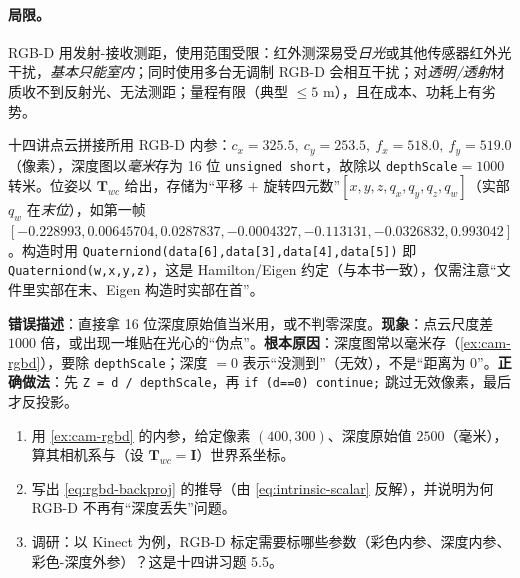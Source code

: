 \paragraph{局限。}
RGB-D 用发射-接收测距，使用范围受限\cite{gaoxiang2019slam14}：红外测深易受\emph{日光}或其他传感器红外光干扰，\emph{基本只能室内}；同时使用多台无调制 RGB-D 会相互干扰；对\emph{透明/透射}材质收不到反射光、无法测距；量程有限（典型 $\le5$ m\cite{carlone2026handbook}），且在成本、功耗上有劣势。

\begin{example}\label{ex:cam-rgbd}
十四讲点云拼接所用 RGB-D 内参\cite{gaoxiang2019slam14}：$c_x=325.5,\ c_y=253.5,\ f_x=518.0,\ f_y=519.0$（像素），深度图以\emph{毫米}存为 16 位 \texttt{unsigned short}，故除以 \texttt{depthScale}$=1000$ 转米。位姿以 $\mathbf{T}_{wc}$ 给出，存储为“平移 $+$ 旋转四元数”$[x,y,z,q_x,q_y,q_z,q_w]$（实部 $q_w$ 在\emph{末位}），如第一帧 $[-0.228993,0.00645704,0.0287837,-0.0004327,-0.113131,-0.0326832,0.993042]$。构造时用 \texttt{Quaterniond(data[6],data[3],data[4],data[5])} 即 \texttt{Quaterniond(w,x,y,z)}，这是 Hamilton/Eigen 约定（与本书一致），仅需注意“文件里实部在末、Eigen 构造时实部在首”。
\end{example}

\begin{pitfall}
\textbf{错误描述}：直接拿 16 位深度原始值当米用，或不判零深度。\textbf{现象}：点云尺度差 $1000$ 倍，或出现一堆贴在光心的“伪点”。\textbf{根本原因}：深度图常以毫米存（\cref{ex:cam-rgbd}），要除 \texttt{depthScale}；深度 $=0$ 表示“没测到”（无效），不是“距离为 0”。\textbf{正确做法}：先 \texttt{Z = d / depthScale}，再 \texttt{if (d==0) continue;} 跳过无效像素，最后才反投影。
\end{pitfall}

\begin{practice}
\begin{enumerate}
  \item 用 \cref{ex:cam-rgbd} 的内参，给定像素 $(400,300)$、深度原始值 $2500$（毫米），算其相机系与（设 $\mathbf{T}_{wc}=\mathbf{I}$）世界系坐标。
  \item 写出 \cref{eq:rgbd-backproj} 的推导（由 \cref{eq:intrinsic-scalar} 反解），并说明为何 RGB-D 不再有“深度丢失”问题。
  \item 调研：以 Kinect 为例，RGB-D 标定需要标哪些参数（彩色内参、深度内参、彩色-深度外参）？这是十四讲习题 5.5\cite{gaoxiang2019slam14}。
\end{enumerate}
\end{practice}

